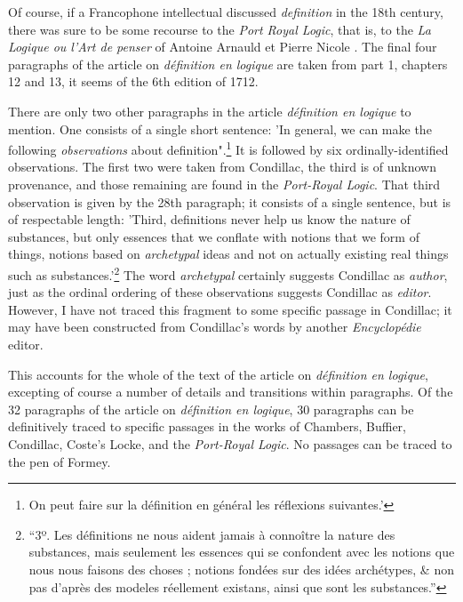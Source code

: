 \documentclass[output=paper]{langscibook}
\begin{document}
Of course, if a Francophone intellectual discussed \emph{definition} in the 18th century, there was sure to be some recourse to the \emph{Port Royal Logic}, that is, to the \emph{La Logique ou l’Art de penser} of Antoine Arnauld et Pierre Nicole \citep{ArnauldNicole1712}. The final four paragraphs of the article on \emph{définition en logique} are taken from part 1, chapters 12 and 13, it seems of the 6th edition of 1712.

There are only two other paragraphs in the article \emph{définition en logique} to mention. One consists of a single short sentence: 'In general, we can make the following \emph{observations} about definition".\footnote{On peut faire sur la définition en général les réflexions suivantes.'} It is followed by six ordinally-identified observations. The first two were taken from Condillac, the third is of unknown provenance, and those remaining are found in the \emph{Port-Royal Logic}. That third observation is given by the 28th paragraph; it consists of a single sentence, but  is of respectable length: 'Third, definitions never help us know the nature of substances, but only essences that we conflate with notions that we form of things, notions based on \emph{archetypal} ideas and not on actually existing real things such as substances.'\footnote{“3º. Les définitions ne nous aident jamais à connoître la nature des substances, mais seulement les essences qui se confondent avec les notions que nous nous faisons des choses ; notions fondées sur des idées archétypes, \& non pas d’après des modeles réellement existans, ainsi que sont les substances.”}  The word \emph{archetypal} certainly suggests Condillac as \emph{author}, just as the ordinal ordering of these observations suggests Condillac as \emph{editor}. However, I have not traced this fragment to some specific passage in Condillac; it may have been constructed from Condillac’s words by another \emph{Encyclopédie} editor.

This accounts for the whole of the text of the article on \emph{définition en logique}, excepting of course a number of details and transitions within paragraphs. Of the 32 paragraphs of the article on \emph{définition en logique}, 30 paragraphs can be definitively traced to specific passages in the works of Chambers, Buffier, Condillac, Coste’s Locke, and the \emph{Port-Royal Logic}. No passages can be traced to the pen of Formey.

\end{document}
